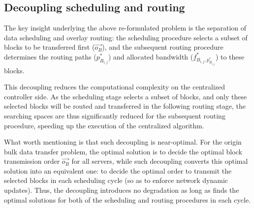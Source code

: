 
\subsection{Decoupling scheduling and routing}
\label{subsec:logic:separation}

The key insight underlying the above re-formulated problem is the
separation of data scheduling and overlay routing: the scheduling procedure selects a subset of blocks to be transferred first
($\overrightarrow{o_B}$), and the subsequent routing procedure determines the routing paths ($p_{B_{i,j}}^*$) and allocated bandwidth ($f^*_{B_{i,j},p_{B_{i,j}}^*}$) to these blocks.

This decoupling reduces the computational complexity on the centralized controller side. As the scheduling stage selects a subset of blocks, and only these selected blocks will be routed and transferred in the following routing stage, the searching spaces are thus significantly reduced for the subsequent routing procedure, speeding up the execution of the centralized algorithm.

What worth mentioning is that such decoupling is near-optimal. For the origin bulk data transfer problem, the optimal solution is to decide the optimal block transmission order $\overrightarrow{o_B}$ for all servers, while such decoupling converts this optimal solution into an equivalent one: to decide the optimal order to transmit the selected blocks in each scheduling cycle (so as to enforce network dynamic updates). Thus, the decoupling introduces no degradation as long as \name finds the optimal solutions for both of the scheduling and routing procedures in each cycle.

